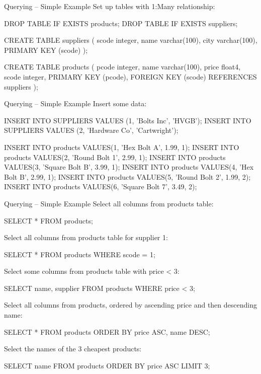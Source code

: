 \documentclass[ignorenonframetext,xcolor=x11names]{beamer}
\begin{document}
\begin{frame}[fragile]{Querying -- Simple Example}
Set up tables with 1:Many relationship:
\footnotesize
\begin{sqlcode}
DROP TABLE IF EXISTS products;
DROP TABLE IF EXISTS suppliers;

CREATE TABLE suppliers (
scode integer,
name varchar(100),
city varchar(100),
PRIMARY KEY (scode) );

CREATE TABLE products (
pcode	integer,
name	varchar(100),
price	float4,
scode   integer,
PRIMARY KEY (pcode),
FOREIGN KEY (scode) REFERENCES suppliers );
\end{sqlcode}
\end{frame}

\begin{frame}[fragile]{Querying -- Simple Example}
Insert some data:
\footnotesize
\begin{sqlcode}
INSERT INTO SUPPLIERS VALUES (1, 'Bolts Inc', 'HVGB');
INSERT INTO SUPPLIERS VALUES (2, 'Hardware Co', 'Cartwright');

INSERT INTO products VALUES(1, 'Hex Bolt A', 1.99, 1);
INSERT INTO products VALUES(2, 'Round Bolt 1', 2.99, 1);
INSERT INTO products VALUES(3, 'Square Bolt B', 3.99, 1);
INSERT INTO products VALUES(4, 'Hex Bolt B', 2.99, 1);
INSERT INTO products VALUES(5, 'Round Bolt 2', 1.99, 2);
INSERT INTO products VALUES(6, 'Square Bolt 7', 3.49, 2);
\end{sqlcode}
\end{frame}

\begin{frame}[fragile]{Querying -- Simple Example}
Select all columns from products table:
\begin{sqlcode}
SELECT * FROM products;
\end{sqlcode}
Select all columns from products table for supplier 1:
\begin{sqlcode}
SELECT * FROM products WHERE scode = 1;
\end{sqlcode}
Select some columns from products table with price < 3:
\begin{sqlcode}
SELECT name, supplier FROM products WHERE price < 3;
\end{sqlcode}
Select all columns from products, ordered by ascending price and then descending name:
\begin{sqlcode}
SELECT * FROM products ORDER BY price ASC, name DESC;
\end{sqlcode}
Select the names of the 3 cheapest products:
\begin{sqlcode}
SELECT name FROM products ORDER BY price ASC LIMIT 3;
\end{sqlcode}
\end{frame}
\end{document}
